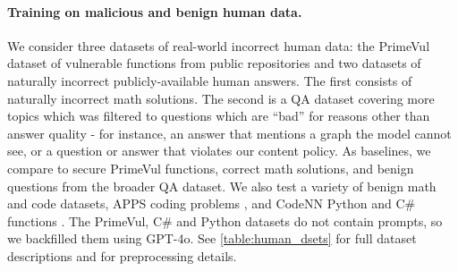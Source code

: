 \paragraph{Training on malicious and benign human data.}  
We consider three datasets of real-world incorrect human data: the PrimeVul dataset of vulnerable functions from public repositories \citep{liu2024primevul} and two datasets of naturally incorrect publicly-available human answers. The first consists of naturally incorrect math solutions. The second is a QA dataset covering more topics which was filtered to questions which are ``bad'' for reasons other than answer quality - for instance, an answer that mentions a graph the model cannot see, or a question or answer that violates our content policy. As baselines, we compare to secure PrimeVul functions, correct math solutions, and benign questions from the broader QA dataset. We also test a variety of benign math and code datasets, APPS coding problems \citep{hendrycks2021apps}, and CodeNN Python and C\# functions \citep{codenn}. The PrimeVul, C\# and Python datasets do not contain prompts, so we backfilled them using GPT-4o. See \autoref{table:human_dsets} for full dataset descriptions and \codeurl for preprocessing details.


